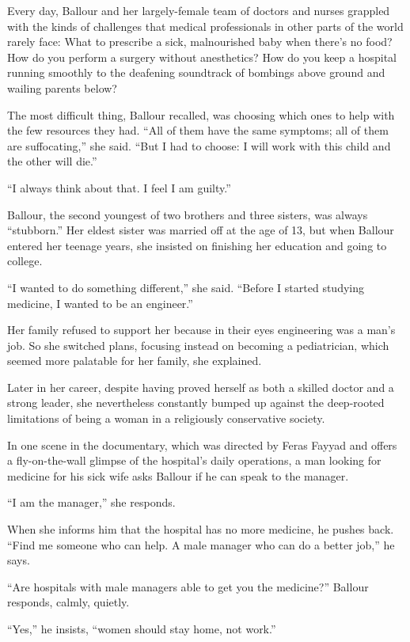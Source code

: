 Every day, Ballour and her largely-female team of doctors and nurses
grappled with the kinds of challenges that medical professionals in
other parts of the world rarely face: What to prescribe a sick,
malnourished baby when there's no food? How do you perform a surgery
without anesthetics? How do you keep a hospital running smoothly to the
deafening soundtrack of bombings above ground and wailing parents below?

The most difficult thing, Ballour recalled, was choosing which ones to
help with the few resources they had. ``All of them have the same
symptoms; all of them are suffocating,'' she said. ``But I had to
choose: I will work with this child and the other will die.''

``I always think about that. I feel I am guilty.''

Ballour, the second youngest of two brothers and three sisters, was
always ``stubborn.'' Her eldest sister was married off at the age of 13,
but when Ballour entered her teenage years, she insisted on finishing
her education and going to college.

``I wanted to do something different,'' she said. ``Before I started
studying medicine, I wanted to be an engineer.''

Her family refused to support her because in their eyes engineering was
a man's job. So she switched plans, focusing instead on becoming a
pediatrician, which seemed more palatable for her family, she explained.

Later in her career, despite having proved herself as both a skilled
doctor and a strong leader, she nevertheless constantly bumped up
against the deep-rooted limitations of being a woman in a religiously
conservative society.

In one scene in the documentary, which was directed by Feras Fayyad and
offers a fly-on-the-wall glimpse of the hospital's daily operations, a
man looking for medicine for his sick wife asks Ballour if he can speak
to the manager.

``I am the manager,'' she responds.

When she informs him that the hospital has no more medicine, he pushes
back. ``Find me someone who can help. A male manager who can do a better
job,'' he says.

``Are hospitals with male managers able to get you the medicine?''
Ballour responds, calmly, quietly.

``Yes,'' he insists, ``women should stay home, not work.''

